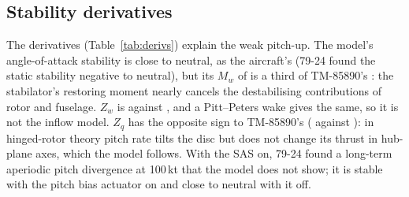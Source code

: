 \documentclass[10pt,a4paper,twocolumn]{article}
\newcommand{\Tab}[1]{}
\begin{document}
\subsection{Stability derivatives}\label{sec:derivs}
\begin{table}[t]
\centering\small
\caption{Longitudinal derivatives at 100\,kt, 16\,400\,lb, FS\,360.4: TM-85890's model, and this model with the pitch bias actuator and stabilator active, and with
them held (rotor and airframe only). Per unit mass or pitch inertia; $\delta_e$ inch aft, $\delta_c$ inch up.}\label{tab:derivs}
\Tab{derivs}
\end{table}
The derivatives (Table~\ref{tab:derivs}) explain the weak pitch-up. The model's angle-of-attack stability is close to neutral, as
the aircraft's (79-24 found the static stability negative to neutral), but its $M_w$ of \NMwmod{} is a third of TM-85890's \NMwgh{}:
the stabilator's restoring moment nearly cancels the destabilising contributions of rotor and fuselage. $Z_w$ is \NZwmod{} against \NZwgh, and a Pitt--Peters wake gives the same, so it is not the
inflow model. $Z_q$ has the opposite sign to TM-85890's (\NZqmod{} against \NZqgh): in hinged-rotor theory pitch rate tilts the disc but does not change
its thrust in hub-plane axes, which the model follows. With the SAS on, 79-24 found a long-term aperiodic pitch divergence at 100\,kt
that the model does not show; it is stable with the pitch bias actuator on and close to neutral with it off.

\end{document}
